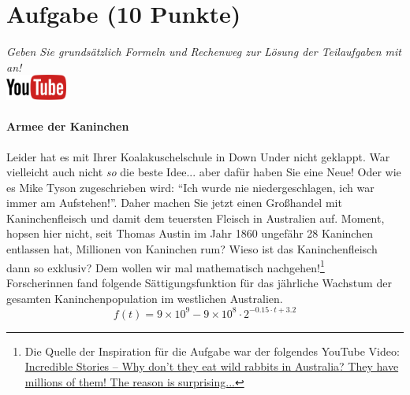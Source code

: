 \documentclass[a4paper, 9pt]{scrartcl}\usepackage[]{graphicx}\usepackage[]{xcolor}
\begin{document}
\clearpage

\section{Aufgabe \hfill (10 Punkte)}

\textit{Geben Sie grunds{\"a}tzlich Formeln und Rechenweg zur L{\"o}sung der
  Teilaufgaben mit an!} \\[1Ex]

\hfill\href{https://youtu.be/Mr6eslls4J0}{\includegraphics[width =
  2cm]{img/youtube}} %
\hspace{2Ex}

\paragraph{Armee der Kaninchen}



Leider hat es mit Ihrer Koalakuschelschule in Down Under nicht geklappt. War vielleicht
auch nicht \textit{so} die beste Idee... aber daf{\"u}r haben Sie eine Neue!
Oder wie es Mike Tyson zugeschrieben wird: "`Ich wurde nie
niedergeschlagen, ich war immer am Aufstehen!"'. Daher machen Sie jetzt
einen Gro{\ss}handel mit Kaninchenfleisch und damit dem teuersten Fleisch in
Australien auf. Moment, hopsen hier nicht, seit Thomas Austin im Jahr
1860 ungef{\"a}hr 28 Kaninchen entlassen hat,
Millionen von Kaninchen rum? Wieso ist das Kaninchenfleisch dann so
exklusiv? Dem wollen wir mal mathematisch nachgehen!\footnote{Die Quelle
  der Inspiration f{\"u}r die Aufgabe war der folgendes YouTube Video:
  \href{https://youtu.be/38fuOr3tdgc?si=Li7NL_FoByML8JtT}{ Incredible
    Stories -- Why don't they eat wild rabbits in Australia? They have
    millions of them! The reason is surprising...}}
\\

Forscherinnen fand folgende S{\"a}ttigungsfunktion f{\"u}r das j{\"a}hrliche Wachstum
der gesamten Kaninchenpopulation im westlichen Australien.
\begin{equation*}
  f(t) = \ensuremath{9\times 10^{9}} - \ensuremath{9\times 10^{8}} \cdot 2^{-0.15 \cdot t + 3.2}
\end{equation*}
\end{document}
